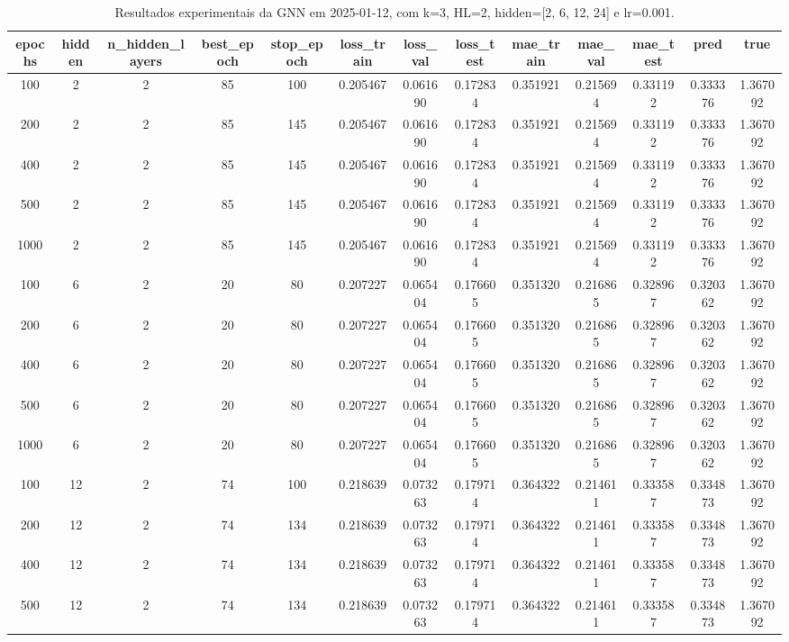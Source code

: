 \begin{table}[h]
\centering
\caption{Resultados experimentais da GNN em 2025-01-12, com k=3, HL=2, hidden=[2, 6, 12, 24] e lr=0.001.}
\label{tab:gnn_results_k3_hl2_d20250112}
\begin{tabular}{ccccccccccccc}
\toprule
epochs & hidden & n\_hidden\_layers & best\_epoch & stop\_epoch & loss\_train & loss\_val & loss\_test & mae\_train & mae\_val & mae\_test & pred & true \\
\midrule
100 & 2 & 2 & 85 & 100 & 0.205467 & 0.061690 & 0.172834 & 0.351921 & 0.215694 & 0.331192 & 0.333376 & 1.367092 \\
200 & 2 & 2 & 85 & 145 & 0.205467 & 0.061690 & 0.172834 & 0.351921 & 0.215694 & 0.331192 & 0.333376 & 1.367092 \\
400 & 2 & 2 & 85 & 145 & 0.205467 & 0.061690 & 0.172834 & 0.351921 & 0.215694 & 0.331192 & 0.333376 & 1.367092 \\
500 & 2 & 2 & 85 & 145 & 0.205467 & 0.061690 & 0.172834 & 0.351921 & 0.215694 & 0.331192 & 0.333376 & 1.367092 \\
1000 & 2 & 2 & 85 & 145 & 0.205467 & 0.061690 & 0.172834 & 0.351921 & 0.215694 & 0.331192 & 0.333376 & 1.367092 \\
100 & 6 & 2 & 20 & 80 & 0.207227 & 0.065404 & 0.176605 & 0.351320 & 0.216865 & 0.328967 & 0.320362 & 1.367092 \\
200 & 6 & 2 & 20 & 80 & 0.207227 & 0.065404 & 0.176605 & 0.351320 & 0.216865 & 0.328967 & 0.320362 & 1.367092 \\
400 & 6 & 2 & 20 & 80 & 0.207227 & 0.065404 & 0.176605 & 0.351320 & 0.216865 & 0.328967 & 0.320362 & 1.367092 \\
500 & 6 & 2 & 20 & 80 & 0.207227 & 0.065404 & 0.176605 & 0.351320 & 0.216865 & 0.328967 & 0.320362 & 1.367092 \\
1000 & 6 & 2 & 20 & 80 & 0.207227 & 0.065404 & 0.176605 & 0.351320 & 0.216865 & 0.328967 & 0.320362 & 1.367092 \\
100 & 12 & 2 & 74 & 100 & 0.218639 & 0.073263 & 0.179714 & 0.364322 & 0.214611 & 0.333587 & 0.334873 & 1.367092 \\
200 & 12 & 2 & 74 & 134 & 0.218639 & 0.073263 & 0.179714 & 0.364322 & 0.214611 & 0.333587 & 0.334873 & 1.367092 \\
400 & 12 & 2 & 74 & 134 & 0.218639 & 0.073263 & 0.179714 & 0.364322 & 0.214611 & 0.333587 & 0.334873 & 1.367092 \\
500 & 12 & 2 & 74 & 134 & 0.218639 & 0.073263 & 0.179714 & 0.364322 & 0.214611 & 0.333587 & 0.334873 & 1.367092 \\

\end{tabular}
\end{table}
